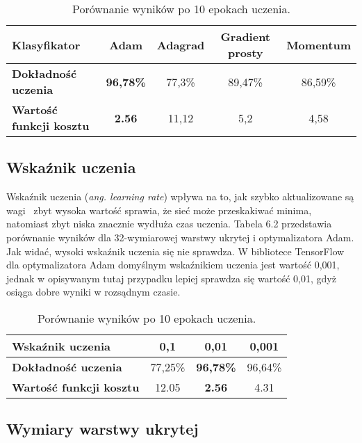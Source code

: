 \begin{table}[H]
\centering
\begin{tabular}{|l|c|c|c|c|}
\hline
\textbf{Klasyfikator}           & Adam             & Adagrad         & Gradient prosty              & Momentum         \\ \hline
\textbf{Dokładność uczenia}     & \textbf{96,78\%} & 77,3\% & 89,47\% & 86,59\% \\ \hline
\textbf{Wartość funkcji kosztu} & \textbf{2.56}           & 11,12         & 5,2            & 4,58           \\ \hline
\end{tabular}%

\caption{Porównanie wyników po 10 epokach uczenia.}
\label{table:bf-sa}
\end{table}

\subsection{Wskaźnik uczenia}

Wskaźnik uczenia (\textit{ang. learning rate}) wpływa na to, jak szybko aktualizowane są wagi \textendash \ zbyt wysoka wartość sprawia, że sieć może przeskakiwać minima, natomiast zbyt niska znacznie wydłuża czas uczenia. Tabela 6.2 przedstawia porównanie wyników dla 32-wymiarowej warstwy ukrytej i optymalizatora Adam. Jak widać, wysoki wskaźnik uczenia się nie sprawdza. W bibliotece TensorFlow dla optymalizatora Adam domyślnym wskaźnikiem uczenia jest wartość 0,001, jednak w opisywanym tutaj przypadku lepiej sprawdza się wartość 0,01, gdyż osiąga dobre wyniki w rozsądnym czasie. 

\begin{table}[H]
\centering

\begin{tabular}{|l|c|c|c|}
\hline
\textbf{Wskaźnik uczenia}       & 0,1     & 0,01    & 0,001   \\ \hline
\textbf{Dokładność uczenia}     & 77,25\% & \textbf{96,78\%} & 96,64\% \\ \hline
\textbf{Wartość funkcji kosztu} & 12.05 & \textbf{2.56}  & 4.31  \\ \hline
\end{tabular}%

\caption{Porównanie wyników po 10 epokach uczenia.}
\label{table:bf-sa}
\end{table}

\subsection{Wymiary warstwy ukrytej}


